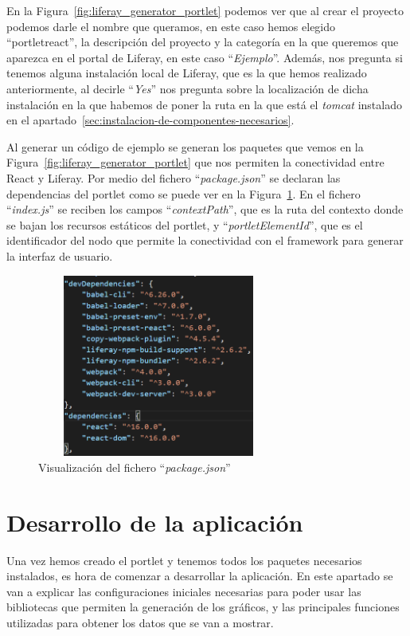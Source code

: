 \documentclass[a4paper, 12pt]{book}
\begin{document}
En la Figura~\ref{fig:liferay_generator_portlet} podemos ver que al crear el proyecto podemos darle el nombre que queramos, en este caso hemos elegido ``portletreact'', la descripción del proyecto y la categoría en la que queremos que aparezca en el portal de Liferay, en este caso ``\textit{Ejemplo}''. 
Además, nos pregunta si tenemos alguna instalación local de Liferay, que es la que hemos realizado anteriormente, al decirle ``\textit{Yes}'' nos pregunta sobre la localización de dicha instalación en la que habemos de poner la ruta en la que está el \textit{tomcat} instalado en el apartado~\ref{sec:instalacion-de-componentes-necesarios}.

Al generar un código de ejemplo se generan los paquetes que vemos en la Figura~\ref{fig:liferay_generator_portlet} que nos permiten la conectividad entre React y Liferay. Por medio del fichero ``\textit{package.json}'' se declaran las dependencias del portlet como se puede ver en la Figura~\ref{fig:package_ini}. En el fichero ``\textit{index.js}'' se reciben los campos ``\textit{contextPath}'', que es la ruta del contexto donde se bajan los recursos estáticos del portlet, y ``\textit{portletElementId}'', que es el identificador del nodo que permite la conectividad con el framework para generar la interfaz de usuario.
\begin{figure}[h]
  \centering
  \includegraphics[width=8cm, height=6cm]{img_usadas/package_ini.png}
  \caption{Visualización del fichero ``\textit{package.json}''}
  \label{fig:package_ini}
\end{figure}


\vspace{5mm}
\section{Desarrollo de la aplicación} 
\label{sec:desarrollo-aplicacion}
Una vez hemos creado el portlet y tenemos todos los paquetes necesarios instalados, es hora de comenzar a desarrollar la aplicación. En este apartado se van a explicar las configuraciones iniciales necesarias para poder usar las bibliotecas que permiten la generación de los gráficos, y las principales funciones utilizadas para obtener los datos que se van a mostrar.
\end{document}
